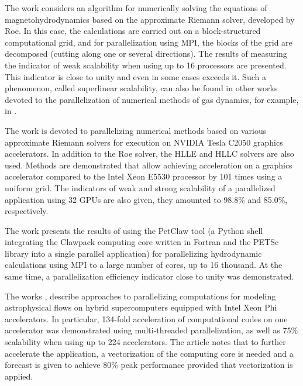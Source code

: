 \documentclass[utf8,english]{psta}%
\begin{document}
The work \cite{Shumlak} considers an algorithm for numerically solving the equations of magnetohydrodynamics based on the approximate Riemann solver, developed by Roe.
In this case, the calculations are carried out on a block-structured computational grid, and for parallelization using MPI, the blocks of the grid are decomposed (cutting along one or several directions).
The results of measuring the indicator of weak scalability when using up to 16 processors are presented.
This indicator is close to unity and even in some cases exceeds it.
Such a phenomenon, called superlinear scalability, can also be found in other works devoted to the parallelization of numerical methods of gas dynamics, for example, in \cite{Benderskij}.

The work \cite{Schive} is devoted to parallelizing numerical methods based on various approximate Riemann solvers for execution on NVIDIA Tesla C2050 graphics accelerators.
In addition to the Roe solver, the HLLE and HLLC \cite{Kong} solvers are also used.
Methods are demonstrated that allow achieving acceleration on a graphics accelerator compared to the Intel Xeon E5530 processor by 101 times using a uniform grid.
The indicators of weak and strong scalability of a parallelized application using 32 GPUs are also given, they amounted to 98.8\% and 85.0\%, respectively.

The work \cite{Mandli} presents the results of using the PetClaw tool (a Python shell integrating the Clawpack computing core written in Fortran and the PETSc library into a single parallel application) for parallelizing hydrodynamic calculations using MPI to a large number of cores, up to 16 thousand.
At the same time, a parallelization efficiency indicator close to unity was demonstrated.

The works \cite{Kulikov}, \cite{Kulikov2} describe approaches to parallelizing computations for modeling astrophysical flows on hybrid supercomputers equipped with Intel Xeon Phi accelerators.
In particular, 134-fold acceleration of computational codes on one accelerator was demonstrated using multi-threaded parallelization, as well as 75\% scalability when using up to 224 accelerators.
The article notes that to further accelerate the application, a vectorization of the computing core is needed and a forecast is given to achieve 80\% peak performance provided that vectorization is applied.
\end{document}
